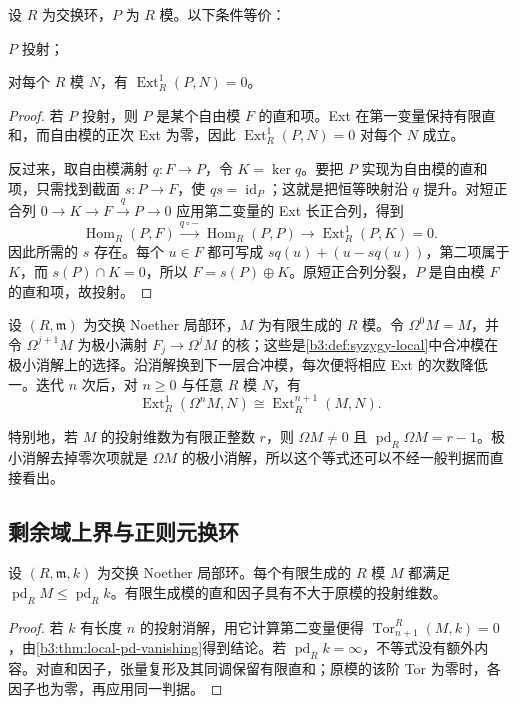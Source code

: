 \begin{proposition}\label{b3:prop:projective-ext-criterion}
	设 \(R\) 为交换环，\(P\) 为 \(R\) 模。以下条件等价：
	\begin{equivalences}
		\item \(P\) 投射；
		\item 对每个 \(R\) 模 \(N\)，有 \(\operatorname{Ext}_R^1(P,N)=0\)。
	\end{equivalences}
\end{proposition}
\begin{proof}
	若 \(P\) 投射，则 \(P\) 是某个自由模 \(F\) 的直和项。Ext 在第一变量保持有限直和，而自由模的正次 Ext 为零，因此 \(\operatorname{Ext}_R^1(P,N)=0\) 对每个 \(N\) 成立。

	反过来，取自由模满射 \(q:F\rightarrow P\)，令 \(K=\ker q\)。要把 \(P\) 实现为自由模的直和项，只需找到截面 \(s:P\to F\)，使 \(qs=\operatorname{id}_P\)；这就是把恒等映射沿 \(q\) 提升。对短正合列 \(0\rightarrow K\rightarrow F\xrightarrow{q}P\rightarrow0\) 应用第二变量的 Ext 长正合列，得到
	\[
		\operatorname{Hom}_R(P,F)\xrightarrow{q\circ-}\operatorname{Hom}_R(P,P) \longrightarrow\operatorname{Ext}_R^1(P,K)=0.
	\]
	因此所需的 \(s\) 存在。每个 \(u\in F\) 都可写成 \(sq(u)+(u-sq(u))\)，第二项属于 \(K\)，而 \(s(P)\cap K=0\)，所以 \(F=s(P)\oplus K\)。原短正合列分裂，\(P\) 是自由模 \(F\) 的直和项，故投射。
\end{proof}

设 \((R,\mathfrak m)\) 为交换 Noether 局部环，\(M\) 为有限生成的 \(R\) 模。令 \(\Omega^0M=M\)，并令 \(\Omega^{j+1}M\) 为极小满射 \(F_j\rightarrow\Omega^jM\) 的核；这些是\cref{b3:def:syzygy-local}中合冲模在极小消解上的选择。沿消解换到下一层合冲模，每次便将相应 Ext 的次数降低一。迭代 \(n\) 次后，对 \(n\ge0\) 与任意 \(R\) 模 \(N\)，有
\[
	\operatorname{Ext}_R^1(\Omega^nM,N)\cong\operatorname{Ext}_R^{n+1}(M,N).
\]

特别地，若 \(M\) 的投射维数为有限正整数 \(r\)，则 \(\Omega M\ne0\) 且 \(\operatorname{pd}_R\Omega M=r-1\)。极小消解去掉零次项就是 \(\Omega M\) 的极小消解，所以这个等式还可以不经一般判据而直接看出。

\subsection{剩余域上界与正则元换环}
\label{b3:subsec:1702:04}

\begin{corollary}\label{b3:cor:residue-pd-bound}
	设 \((R,\mathfrak m,k)\) 为交换 Noether 局部环。每个有限生成的 \(R\) 模 \(M\) 都满足 \(\operatorname{pd}_RM\le\operatorname{pd}_Rk\)。有限生成模的直和因子具有不大于原模的投射维数。
\end{corollary}
\begin{proof}
	若 \(k\) 有长度 \(n\) 的投射消解，用它计算第二变量便得 \(\operatorname{Tor}_{n+1}^R(M,k)=0\)，由\cref{b3:thm:local-pd-vanishing}得到结论。若 \(\operatorname{pd}_Rk=\infty\)，不等式没有额外内容。对直和因子，张量复形及其同调保留有限直和；原模的该阶 Tor 为零时，各因子也为零，再应用同一判据。
\end{proof}

